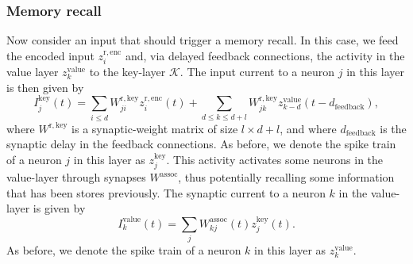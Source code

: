 \documentclass{article}
\begin{document}
\subsubsection{Memory recall}
Now consider an input that should trigger a memory recall. In this case, we feed the encoded input $z_i^{\mathrm{r,enc}}$ and, via delayed feedback connections, the activity in the value layer $z_k^{\mathrm{value}}$ to the key-layer $\mathcal{K}$. The input current to a neuron $j$ in this layer is then given by
\begin{equation}
    I^{\mathrm{key}}_j(t) = \sum_{i \le d} W^\mathrm{r,key}_{ji} z_i^{\mathrm{r,enc}}(t) + \sum_{d \le k \le d+l} W^\mathrm{r,key}_{jk} z_{k-d}^{\mathrm{value}}(t-d_{\mathrm{feedback}}),
\end{equation}
where $W^{\mathrm{r,key}}$ is a synaptic-weight matrix of size $l \times d + l$, and where $d_{\mathrm{feedback}}$ is the synaptic delay in the feedback connections. As before, we denote the spike train of a neuron $j$ in this layer as $z_j^{\mathrm{key}}$. This activity activates some neurons in the value-layer through synapses $W^{\mathrm{assoc}}$, thus potentially recalling some information that has been stores previously. The synaptic current to a neuron $k$ in the value-layer is given by
\begin{equation}
    I^{\mathrm{value}}_{k}(t) = \sum_j W_{kj}^{\mathrm{assoc}}(t) z_j^{\mathrm{key}}(t).
\end{equation}
As before, we denote the spike train of a neuron $k$ in this layer as $z_k^{\mathrm{value}}$.
\end{document}
